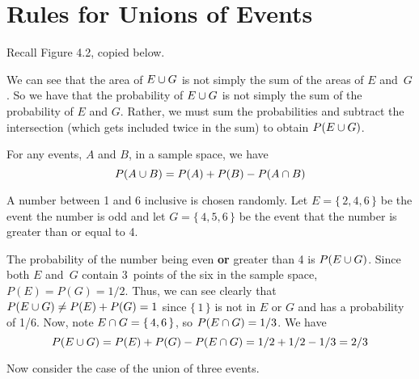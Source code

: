 \section{Rules for Unions of Events}
Recall Figure 4.2, copied below.
\par
\begin{figure}[h]
\centering
{}
\end{figure}
We can see that the area of $E \cup G$ is not simply the sum of the areas of $E$ and~$G$. So we have that the probability of $E \cup G$ is not simply the sum of the probability of $E$ and $G$. Rather, we must sum the probabilities and subtract the intersection (which gets included twice in the sum) to obtain $P(E \cup G)$.
\begin{theorem}
For any events, $A$ and $B$, in a sample space, we have
\[
    P(A \cup B) = P(A) + P(B) - P(A \cap B)
\]
\end{theorem}
\begin{example}
A number between 1 and 6 inclusive is chosen randomly. Let $E = \{\, 2,4,6 \,\}$ be the event the number is odd and let $G = \{\, 4,5,6 \,\}$ be the event that the number is greater than or equal to 4.
\par\smallskip
The probability of the number being even \textbf{or} greater than 4 is $P(E \cup G)$. Since both $E$ and~$G$ contain 3~points of the six in the sample space, $P(E) = P(G) = 1/2$. Thus, we can see clearly that $P(E \cup G) \neq P(E) + P(G) = 1$ since $\{\, 1 \,\}$ is not in $E$ or $G$ and has a probability of 1/6. Now, note $E \cap G = \{\, 4,6 \,\}$, so $P(E \cap G) = 1/3$. We have
\[
    P(E \cup G) = P(E) + P(G) - P(E \cap G) = 1/2 + 1/2 - 1/3 = 2/3
\]
\end{example}
\pagebreak[3]
Now consider the case of the union of three events.\par
